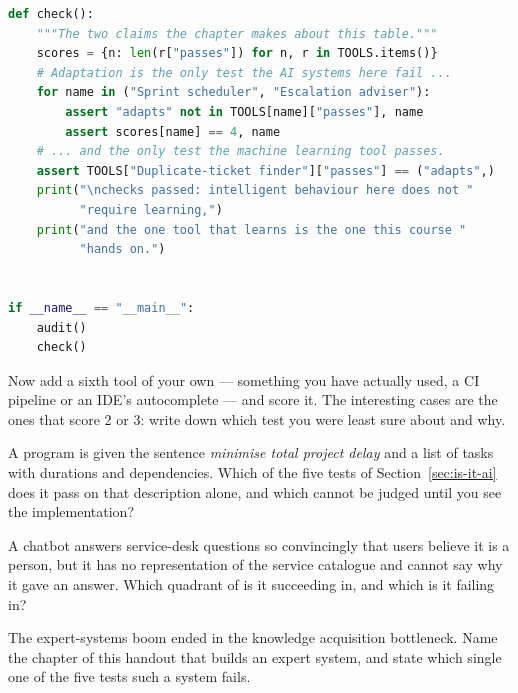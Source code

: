 \begin{lab}
\begin{lstlisting}[language=Python]
def check():
    """The two claims the chapter makes about this table."""
    scores = {n: len(r["passes"]) for n, r in TOOLS.items()}
    # Adaptation is the only test the AI systems here fail ...
    for name in ("Sprint scheduler", "Escalation adviser"):
        assert "adapts" not in TOOLS[name]["passes"], name
        assert scores[name] == 4, name
    # ... and the only test the machine learning tool passes.
    assert TOOLS["Duplicate-ticket finder"]["passes"] == ("adapts",)
    print("\nchecks passed: intelligent behaviour here does not "
          "require learning,")
    print("and the one tool that learns is the one this course "
          "hands on.")


if __name__ == "__main__":
    audit()
    check()
\end{lstlisting}
Now add a sixth tool of your own --- something you have actually used, a CI
pipeline or an IDE's autocomplete --- and score it. The interesting cases are the
ones that score 2 or 3: write down which test you were least sure about and why.
\end{lab}

\begin{checkpoint}
\begin{tightnum}
  \item A program is given the sentence \emph{minimise total project delay} and a
        list of tasks with durations and dependencies. Which of the five tests of
        Section~\ref{sec:is-it-ai} does it pass on that description alone, and
        which cannot be judged until you see the implementation?
  \item A chatbot answers service-desk questions so convincingly that users
        believe it is a person, but it has no representation of the service catalogue
        and cannot say why it gave an answer. Which quadrant of  is
        it succeeding in, and which is it failing in?
  \item The expert-systems boom ended in the knowledge acquisition bottleneck.
        Name the chapter of this handout that builds an expert system, and state
        which single one of the five tests such a system fails.
\end{tightnum}
\end{checkpoint}

